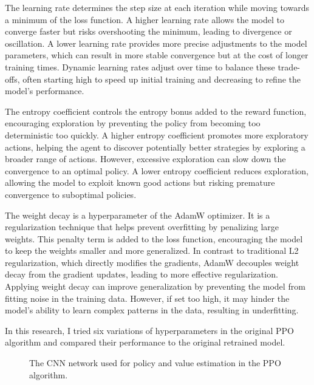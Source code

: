 \documentclass[10pt,conference]{IEEEtran}
\begin{document}
The learning rate determines the step size at each iteration while moving towards a minimum of the loss function. A higher learning rate allows the model to converge faster but risks overshooting the minimum, leading to divergence or oscillation. A lower learning rate provides more precise adjustments to the model parameters, which can result in more stable convergence but at the cost of longer training times. Dynamic learning rates adjust over time to balance these trade-offs, often starting high to speed up initial training and decreasing to refine the model's performance.

The entropy coefficient controls the entropy bonus added to the reward function, encouraging exploration by preventing the policy from becoming too deterministic too quickly. A higher entropy coefficient promotes more exploratory actions, helping the agent to discover potentially better strategies by exploring a broader range of actions. However, excessive exploration can slow down the convergence to an optimal policy. A lower entropy coefficient reduces exploration, allowing the model to exploit known good actions but risking premature convergence to suboptimal policies.

The weight decay is a hyperparameter of the AdamW optimizer. It is a regularization technique that helps prevent overfitting by penalizing large weights. This penalty term is added to the loss function, encouraging the model to keep the weights smaller and more generalized. In contrast to traditional L2 regularization, which directly modifies the gradients, AdamW decouples weight decay from the gradient updates, leading to more effective regularization. Applying weight decay can improve generalization by preventing the model from fitting noise in the training data. However, if set too high, it may hinder the model's ability to learn complex patterns in the data, resulting in underfitting.

In this research, I tried six variations of hyperparameters in the original PPO algorithm and compared their performance to the original retrained model.



\begin{figure}[h]
  \centering
  \caption{The CNN network used for policy and value estimation in the PPO algorithm.}
  \label{fig:cnn}
\end{figure}
\end{document}
